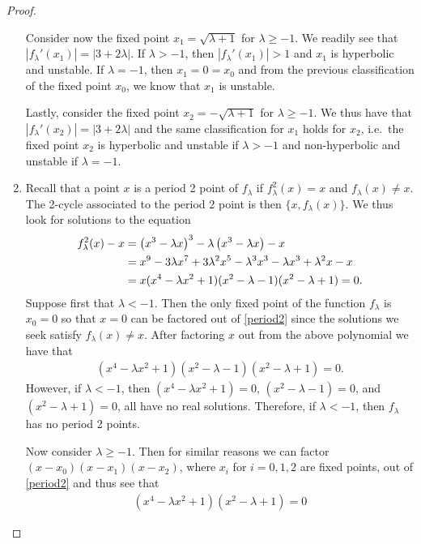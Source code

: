 \begin{proof}
\begin{enumerate}
      Consider now the fixed point $x_1 = \sqrt{\lambda + 1}$ for $\lambda \geq -1$. We readily see that $|f_\lambda'(x_1)| = |3 + 2\lambda|$.
      If $\lambda > -1$, then $|f_\lambda'(x_1)| > 1$ and $x_1$ is
      hyperbolic and unstable. If $\lambda = -1$, then $x_1 = 0 = x_0$ and from the previous
      classification of the fixed point $x_0$, we know that $x_1$ is unstable.

      Lastly, consider the fixed point $x_2 = -\sqrt{\lambda + 1}$ for $\lambda \geq -1$.
      We thus have that $|f_\lambda'(x_2)| = |3 + 2\lambda|$ and the same classification for $x_1$ holds for $x_2$, i.e.\
      the fixed point $x_2$ is hyperbolic and unstable if $\lambda > -1$ and non-hyperbolic and unstable if $\lambda = -1$.

    \item Recall that a point $x$ is a period 2 point of $f_\lambda$ if $f_\lambda^2(x) = x$ and $f_\lambda(x) \neq x$. The 2-cycle associated to the period 2 point
      is then $\{x, f_\lambda(x)\}$. We thus look for solutions to the equation
      \begin{align}\label{period2}
        f_\lambda^2(x) - x &= \left(x^3 - \lambda x\right)^3 - \lambda \left(x^3 - \lambda x\right) - x \notag\\
        &= x^9 -3 \lambda x^7 + 3 \lambda ^2 x ^5 - \lambda ^3 x^3 - \lambda x^3 + \lambda^2 x - x \notag\\
        &= x (x^4- \lambda x^2 + 1)(x^2 - \lambda -1) (x^2 - \lambda + 1) = 0.
      \end{align}
      Suppose first that $\lambda < -1$. Then the only fixed point of the function $f_\lambda$
      is $x_0 = 0$ so that $x=0$ can be factored out of \eqref{period2} since the solutions we seek satisfy $f_\lambda(x) \neq x$. After factoring $x$ out from the above polynomial we have that
      \begin{align*}
        (x^4- \lambda x^2 + 1)(x^2 - \lambda -1) (x^2 - \lambda + 1) = 0.
      \end{align*}
      However, if $\lambda < -1$, then $(x^4- \lambda x^2 + 1) = 0$, $(x^2 - \lambda -1) = 0$,
      and $(x^2 - \lambda + 1) = 0$, all have no real solutions. Therefore, if $\lambda < -1$,
      then $f_\lambda$ has no period 2 points.

      Now consider $\lambda \geq -1$. Then for similar reasons we can factor $(x - x_0)(x - x_1)(x - x_2)$,
      where $x_i$ for $i=0,1,2$ are fixed points, out of \eqref{period2} and thus see that
      \begin{align*}
        (x^4- \lambda x^2 + 1)(x^2 - \lambda + 1) = 0
      \end{align*}


\end{enumerate}
\end{proof}
